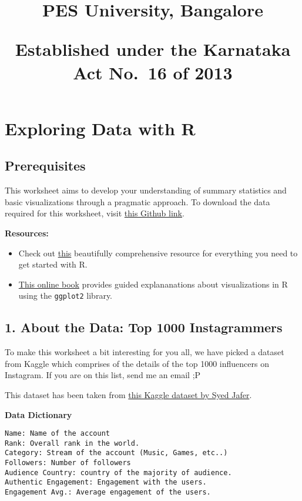 \documentclass[
]{article}
\title{PES University, Bangalore

Established under the Karnataka Act No.~16 of 2013}
\subtitle{\textbf{UE20CS312 - Data Analytics}

\textbf{Worksheet 1a - Part 1: Exploring Data with R}

Harshith Mohan Kumar -
\href{mailto:harshithmohankumar@pesu.pes.edu}{\nolinkurl{harshithmohankumar@pesu.pes.edu}}

Anushka Hebbar -
\href{mailto:anushkahebbar@pesu.pes.edu}{\nolinkurl{anushkahebbar@pesu.pes.edu}}}
\author{}
\date{\vspace{-2.5em}}
\providecommand{\tightlist}{%
  \setlength{\itemsep}{0pt}\setlength{\parskip}{0pt}}
\begin{document}
\maketitle

\hypertarget{exploring-data-with-r}{%
\section{Exploring Data with R}\label{exploring-data-with-r}}

\hypertarget{prerequisites}{%
\subsection{Prerequisites}\label{prerequisites}}

This worksheet aims to develop your understanding of summary statistics
and basic visualizations through a pragmatic approach. To download the
data required for this worksheet, visit
\href{https://tinyurl.com/worksheet1a-part1}{this Github link}.

\textbf{Resources: }

\begin{itemize}
\tightlist
\item
  Check out \href{https://intro2r.com/}{this} beautifully comprehensive
  resource for everything you need to get started with R.
\item
  \href{https://r-graphics.org/}{This online book} provides guided
  explananations about visualizations in R using the \texttt{ggplot2}
  library.
\end{itemize}

\hypertarget{about-the-data-top-1000-instagrammers}{%
\subsection{1. About the Data: Top 1000
Instagrammers}\label{about-the-data-top-1000-instagrammers}}

To make this worksheet a bit interesting for you all, we have picked a
dataset from Kaggle which comprises of the details of the top 1000
influencers on Instagram. If you are on this list, send me an email ;P

This dataset has been taken from
\href{https://www.kaggle.com/datasets/syedjaferk/top-1000-instagrammers-world-cleaned?resource=download}{this
Kaggle dataset by Syed Jafer}.

\textbf{Data Dictionary}

\begin{verbatim}
Name: Name of the account
Rank: Overall rank in the world.
Category: Stream of the account (Music, Games, etc..)
Followers: Number of followers
Audience Country: country of the majority of audience.
Authentic Engagement: Engagement with the users.
Engagement Avg.: Average engagement of the users.
\end{verbatim}
\end{document}
